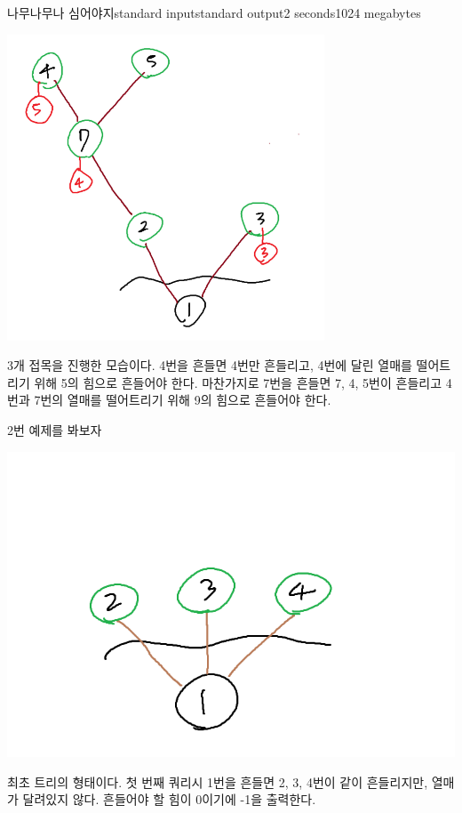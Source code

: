 \begin{problem}{나무나무나 심어야지}{standard input}{standard output}{2 seconds}{1024 megabytes}
\begin{center}
\includegraphics[bb=0 0 100 200]{2img.png}

\end{center} 
3개 접목을 진행한 모습이다. 4번을 흔들면 4번만 흔들리고, 4번에 달린 열매를 떨어트리기 위해 5의 힘으로 흔들어야 한다.
마찬가지로 7번을 흔들면 7, 4, 5번이 흔들리고 4번과 7번의 열매를 떨어트리기 위해 9의 힘으로 흔들어야 한다.

2번 예제를 봐보자
\begin{center}

\includegraphics[scale=0.5]{3img.png}

\end{center} 
최초 트리의 형태이다. 첫 번째 쿼리시 1번을 흔들면 2, 3, 4번이 같이 흔들리지만, 열매가 달려있지 않다. 흔들어야 할 힘이 0이기에 -1을 출력한다.
\begin{center}


\end{center}
\end{problem}
